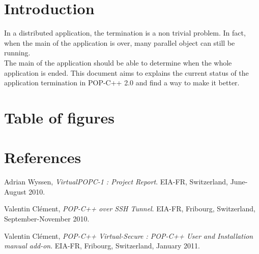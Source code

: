 \documentclass[a4paper, 11pt]{article}
\begin{document}




\tableofcontents
\pagebreak
\section{Introduction}
In a distributed application, the termination is a non trivial problem. In fact, when the main of the application is over, many parallel object can still be running. \\
The main of the application should be able to determine when the whole application is ended. This document aims to explains the current status of the application termination in POP-C++ 2.0 and find a way to make it better. 





\pagebreak
\section{Table of figures}
\listoffigures{}





%
%

\section{References}
\begin{thebibliography}{9}
	Adrian Wyssen,
  	\emph{VirtualPOPC-1 : Project Report}.
	EIA-FR, Switzerland, 
	June-August 2010.
	
	Valentin Clément,
	\emph{POP-C++ over SSH Tunnel}.
	EIA-FR, Fribourg, Switzerland,
	September-November 2010.
	
	Valentin Clément,
	\emph{POP-C++ Virtual-Secure : POP-C++ User and Installation manual add-on}.
	EIA-FR, Fribourg, Switzerland, 
	January 2011.

\end{thebibliography}
\end{document}
